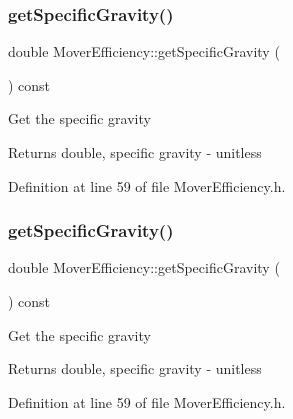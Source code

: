 \mbox{\label{class_mover_efficiency_a4acdd89fec01daef4902238202e00884}} 
\subsubsection{\texorpdfstring{get\+Specific\+Gravity()}{getSpecificGravity()}\hspace{0.1cm}{\footnotesize\ttfamily [1/3]}}
{\footnotesize\ttfamily double Mover\+Efficiency\+::get\+Specific\+Gravity (\begin{DoxyParamCaption}{ }\end{DoxyParamCaption}) const\hspace{0.3cm}{\ttfamily [inline]}}

Get the specific gravity \begin{DoxyReturn}{Returns}
double, specific gravity -\/ unitless 
\end{DoxyReturn}


Definition at line 59 of file Mover\+Efficiency.\+h.

\mbox{\label{class_mover_efficiency_a4acdd89fec01daef4902238202e00884}} 
\subsubsection{\texorpdfstring{get\+Specific\+Gravity()}{getSpecificGravity()}\hspace{0.1cm}{\footnotesize\ttfamily [2/3]}}
{\footnotesize\ttfamily double Mover\+Efficiency\+::get\+Specific\+Gravity (\begin{DoxyParamCaption}{ }\end{DoxyParamCaption}) const\hspace{0.3cm}{\ttfamily [inline]}}

Get the specific gravity \begin{DoxyReturn}{Returns}
double, specific gravity -\/ unitless 
\end{DoxyReturn}


Definition at line 59 of file Mover\+Efficiency.\+h.

